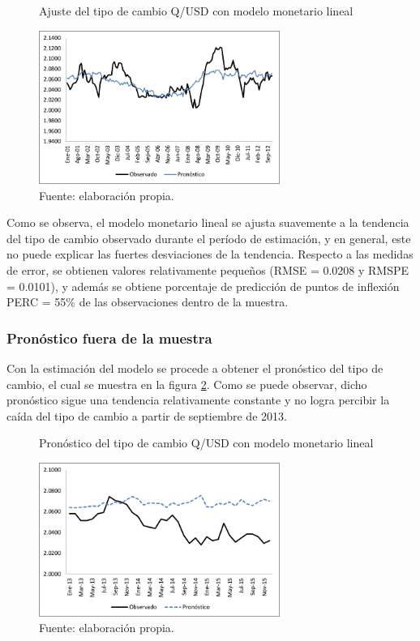 \begin{figure}[htb]
	\centering
	\caption{Ajuste del tipo de cambio Q/USD con modelo monetario lineal}
	\label{fig:linin}
	\includegraphics[width=0.7\textwidth]{figuras/lin_in.png}
	\caption*{Fuente: elaboración propia.}
\end{figure}

Como se observa, el modelo monetario lineal se ajusta suavemente a la tendencia del tipo de cambio observado durante el período de estimación, y en general, este no puede explicar las fuertes desviaciones de la tendencia. Respecto a las medidas de error, se obtienen valores relativamente pequeños (RMSE = 0.0208 y RMSPE = 0.0101), y además se obtiene porcentaje de predicción de puntos de inflexión PERC = 55\% de las observaciones dentro de la muestra.

\newpage
\subsubsection{Pronóstico fuera de la muestra}
Con la estimación del modelo se procede a obtener el pronóstico del tipo de cambio, el cual se muestra en la figura \ref{fig:linout}. Como se puede observar, dicho pronóstico sigue una tendencia relativamente constante y no logra percibir la caída del tipo de cambio a partir de septiembre de 2013.\\

\begin{figure}[htb]
	\centering
	\caption{Pronóstico del tipo de cambio Q/USD con modelo monetario lineal}
	\label{fig:linout}
	\includegraphics[width=0.7\textwidth]{figuras/lin_out.png}
	\caption*{Fuente: elaboración propia.}
\end{figure}

